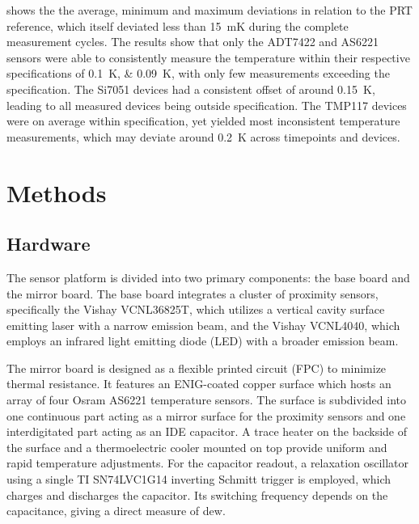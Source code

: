 \documentclass[conference,a4paper]{IEEEtran}
\begin{document}
 shows the the average, minimum and maximum deviations in relation to the PRT reference, which itself deviated less than \qty{15}{\milli\K} during the complete measurement cycles.
The results show that only the ADT7422 and AS6221 sensors were able to consistently measure the temperature within their respective specifications of \qtylist{0.1;0.09}{\K}, with only few measurements exceeding the specification. The Si7051 devices had a consistent offset of around \qty[retain-explicit-plus]{+0.15}{\K}, leading to all measured devices being outside specification. The TMP117 devices were on average within specification, yet yielded most inconsistent temperature measurements, which may deviate around \qty{0.2}{\K} across timepoints and devices.

\section{Methods}
\subsection{Hardware}
The sensor platform is divided into two primary components: the base board and the mirror board. The base board integrates a cluster of proximity sensors, specifically the Vishay VCNL36825T, which utilizes a vertical cavity surface emitting laser with a narrow emission beam, and the Vishay VCNL4040, which employs an infrared light emitting diode (LED) with a broader emission beam.

The mirror board is designed as a flexible printed circuit (FPC) to minimize thermal resistance. It features an ENIG-coated copper surface which hosts an array of four Osram AS6221 temperature sensors. The surface is subdivided into one continuous part acting as a mirror surface for the proximity sensors and one interdigitated part acting as an IDE capacitor. A trace heater on the backside of the surface and a thermoelectric cooler mounted on top  provide uniform and rapid temperature adjustments. For the capacitor readout, a relaxation oscillator using a single TI SN74LVC1G14 inverting Schmitt trigger is employed, which charges and discharges the capacitor. Its switching frequency depends on the capacitance, giving a direct measure of dew.
\end{document}
